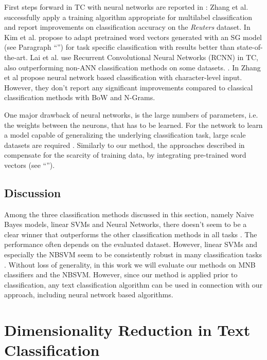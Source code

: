 First steps forward in TC with neural networks are reported in
\cite{zhang2006multilabel}: Zhang et al. successfully apply a training algorithm
appropriate for multilabel classification and report improvements on
classification accuracy on the \emph{Reuters} dataset. In
\cite{kim2014convolutional} Kim et al. propose to adapt pretrained word
vectors generated with an SG model (see Paragraph ``'') for task
specific classification with results better than state-of-the-art. Lai et al.
use Recurrent Convolutional Neural Networks (RCNN) in TC, also outperforming non-ANN
classification methods on some datasets. \cite{lai2015recurrent}. In
\cite{zhang2015character} Zhang et al propose neural network based classification with character-level
input. However, they don't report any significant improvements compared to
classical classification methods with BoW and N-Grams.

One major drawback of neural networks, is the large numbers of parameters, i.e.
the weights between the neurons, that has to be learned. For the network to learn a
model capable of generalizing the underlying classification task, large scale
datasets are required \cite{zhang2015character}. Similarly to our method, the 
approaches described in \cite{lai2015recurrent, kim2014convolutional, wang2016semantic} 
compensate for the scarcity of training data, by integrating pre-trained word vectors (see
``''). 

\subsection{Discussion}

Among the three classification methods discussed in this section, namely Naive
Bayes models, linear SVMs and Neural Networks, there doesn't seem to be a clear
winner that outperforms the other classification methods in all tasks
\cite{wang2012baselines, zhang2015character}. The performance often depends on
the evaluated dataset. However, linear SVMs and especially the NBSVM seem to be
consistently robust in many classification tasks \cite{le2014distributed}. Without loss of generality,
in this work we will evaluate our methods on MNB classifiers and the NBSVM. However, 
since our method is applied prior to classification, any text classification
algorithm can be used in connection with our approach, including neural network 
based algorithms.

\section{Dimensionality Reduction in Text Classification}

